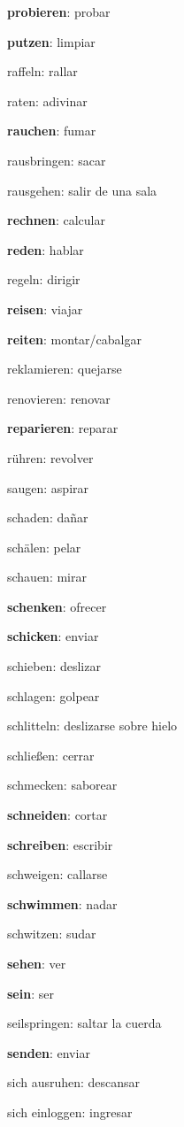\begin{multicols}{2}
\begin{myitemize}
\item \textbf{probieren}: probar
\item \textbf{putzen}: limpiar
\item raffeln: rallar
\item raten: adivinar
\item \textbf{rauchen}: fumar
\item rausbringen: sacar
\item rausgehen: salir de una sala
\item \textbf{rechnen}: calcular
\item \textbf{reden}: hablar
\item regeln: dirigir
\item \textbf{reisen}: viajar
\item \textbf{reiten}: montar/cabalgar
\item reklamieren: quejarse
\item renovieren: renovar
\item \textbf{reparieren}: reparar
\item rühren: revolver
\item saugen: aspirar
\item schaden: dañar
\item schälen: pelar 
\item schauen: mirar
\item \textbf{schenken}: ofrecer
\item \textbf{schicken}: enviar
\item schieben: deslizar
\item schlagen: golpear
\item schlitteln: deslizarse sobre hielo
\item schließen: cerrar
\item schmecken: saborear
\item \textbf{schneiden}: cortar
\item \textbf{schreiben}: escribir
\item schweigen: callarse
\item \textbf{schwimmen}: nadar
\item schwitzen: sudar
\item \textbf{sehen}: ver
\item \textbf{sein}: ser
\item seilspringen: saltar la cuerda
\item \textbf{senden}: enviar
\item sich ausruhen: descansar
\item sich einloggen: ingresar

\end{myitemize}
\end{multicols}
